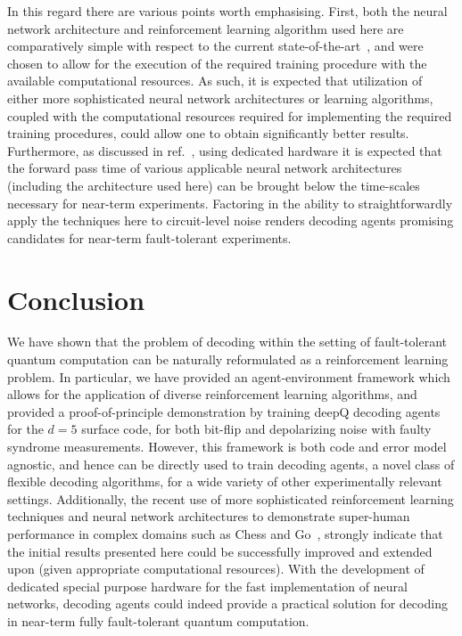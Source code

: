 \documentclass[twocolumn,preprintnumbers,amsmath,amssymb,notitlepage,nofootinbib,longbibliography,superscriptaddress,aps,pra,10pt]{revtex4-1}
\begin{document}
	In this regard there are various points worth emphasising.
	First, both the neural network architecture and reinforcement learning algorithm used here are comparatively simple with respect to the current state-of-the-art~\cite{RLmnih2016asynchronous,RLSilver17b,RLsilver2017mastering,RLSilver2016}, and were chosen to allow for the execution of the required training procedure with the available computational resources.
	As such, it is expected that utilization of either more sophisticated neural network architectures or learning algorithms, coupled with the computational resources required for implementing the required training procedures, could allow one to obtain significantly better results.
	Furthermore, as discussed in ref.~\cite{chamberland2018deep}, using dedicated hardware it is expected that the forward pass time of various applicable neural network architectures (including the architecture used here) can be brought below the time-scales necessary for near-term experiments.
	Factoring in the ability to straightforwardly apply the techniques here to circuit-level noise renders decoding agents promising candidates for near-term fault-tolerant experiments.

\section{Conclusion}\label{s:conclusions}

	We have shown that the problem of decoding within the setting of fault-tolerant quantum computation can be naturally reformulated as a reinforcement learning problem.
	In particular, we have provided an agent-environment framework which allows for the application of diverse reinforcement learning algorithms, and provided a proof-of-principle demonstration by training deepQ decoding agents for the $d=5$ surface code, for both bit-flip and depolarizing noise with faulty syndrome measurements.
	However, this framework is both code and error model agnostic, and hence can be directly used to train decoding agents, a novel class of flexible decoding algorithms, for a wide variety of other experimentally relevant settings.
	Additionally, the recent use of more sophisticated reinforcement learning techniques and neural network architectures to demonstrate super-human performance in complex domains such as Chess and Go~\cite{RLSilver17b,RLsilver2017mastering,RLSilver2016}, strongly indicate that the initial results presented here could be successfully improved and extended upon (given appropriate computational resources).
	With the development of dedicated special purpose hardware for the fast implementation of neural networks, decoding agents could indeed provide a practical solution for decoding in near-term fully fault-tolerant quantum computation.
\end{document}
